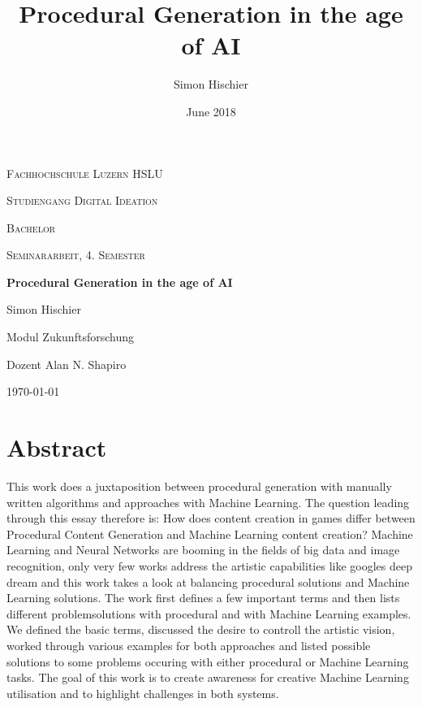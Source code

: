 \documentclass[10pt,a4paper]{article}
\title{Procedural Generation in the age of AI}
\author{Simon Hischier}
\date{June 2018}
\begin{document}
\begin{titlepage}
\centering
\vspace{1cm}
	{\scshape\LARGE Fachhochschule Luzern HSLU \par}
	\vspace{1cm}
	{\scshape\Large Studiengang Digital Ideation \par}
	{\scshape\Large Bachelor \par}
	{\scshape\Large Seminararbeit, 4. Semester\par}
	\vspace{1.5cm}
	{\huge\bf Procedural Generation in the age of AI\par}
	
	\vspace{10cm}
	{\Large Simon Hischier\par}
	{\Large Modul Zukunftsforschung\par}
	{\Large Dozent Alan N. Shapiro\par}
	\vfill

	{\large \today\par}
\end{titlepage}

\renewcommand{\contentsname}{Inhalt}
\tableofcontents
\newpage

\section{Abstract}
This work does a juxtaposition between procedural generation with manually written algorithms and approaches with Machine Learning. The question leading through this essay therefore is: How does content creation in games differ between Procedural Content Generation and Machine Learning content creation? Machine Learning and Neural Networks are booming in the fields of big data and image recognition, only very few works address the artistic capabilities like googles deep dream and this work takes a look at balancing procedural solutions and Machine Learning solutions. The work first defines a few important terms and then lists different problemsolutions with procedural and with Machine Learning examples. We defined the basic terms, discussed the desire to controll the artistic vision, worked through various examples for both approaches and listed possible solutions to some problems occuring with either procedural or Machine Learning tasks. The goal of this work is to create awareness for creative Machine Learning utilisation and to highlight challenges in both systems.
\end{document}
